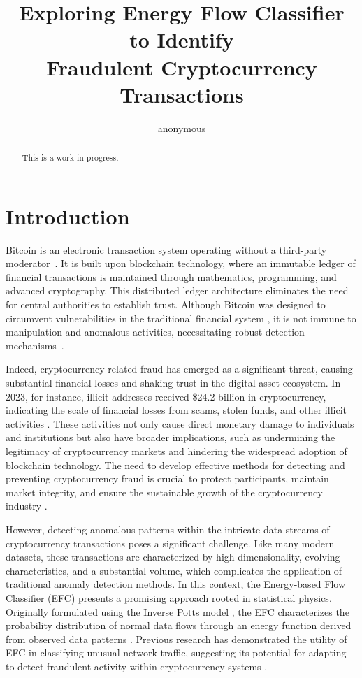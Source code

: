 \documentclass[12pt]{article}
\title{Exploring Energy Flow Classifier to Identify \\ Fraudulent Cryptocurrency Transactions}
\author{anonymous}
\begin{document}
 

\maketitle

\begin{abstract}
  This is a work in progress.
\end{abstract}

\section{Introduction} \label{sec:introduction}
Bitcoin is an electronic transaction system operating without a third-party moderator~\cite{nakamoto2008bitcoin}. It is built
upon blockchain technology, where an immutable ledger of financial transactions is maintained through mathematics, programming,
and advanced cryptography. This distributed ledger architecture eliminates the need for central authorities to establish trust.
Although Bitcoin was designed to circumvent vulnerabilities in the traditional financial system \cite{nakamoto2008bitcoin},
it is not immune to manipulation and anomalous activities, necessitating robust detection mechanisms~\cite{fang2022cryptocurrency,
zhang2020financial,zainal2018review}. 

Indeed, cryptocurrency-related fraud has emerged as a significant threat, causing substantial financial losses and shaking
trust in the digital asset ecosystem. In 2023, for instance, illicit addresses received \$24.2 billion in cryptocurrency,
indicating the scale of financial losses from scams, stolen funds, and other illicit activities \cite{chainalysis2024cryptocrime}.
These activities not only cause direct monetary damage to individuals and institutions but also have broader implications,
such as undermining the legitimacy of cryptocurrency markets and hindering the widespread adoption of blockchain technology.
The need to develop effective methods for detecting and preventing cryptocurrency fraud is crucial to protect participants,
maintain market integrity, and ensure the sustainable growth of the cryptocurrency industry \cite{scharfman2024, Khiari2025}.

However, detecting anomalous patterns within the intricate data streams of cryptocurrency transactions poses a significant
challenge. Like many modern datasets, these transactions are characterized by high dimensionality, evolving characteristics,
and a substantial volume, which complicates the application of traditional anomaly detection methods. In this context, the
Energy-based Flow Classifier (EFC) presents a promising approach rooted in statistical physics. Originally formulated using
the Inverse Potts model \cite{pontes2019}, the EFC characterizes the probability distribution of normal data flows through
an energy function derived from observed data patterns \cite{pontes2019}. Previous research has demonstrated the utility
of EFC in classifying unusual network traffic, suggesting its potential for adapting to detect fraudulent activity within
cryptocurrency systems \cite{pontes2019, souza2022novelopensetenergybased}.
\end{document}
